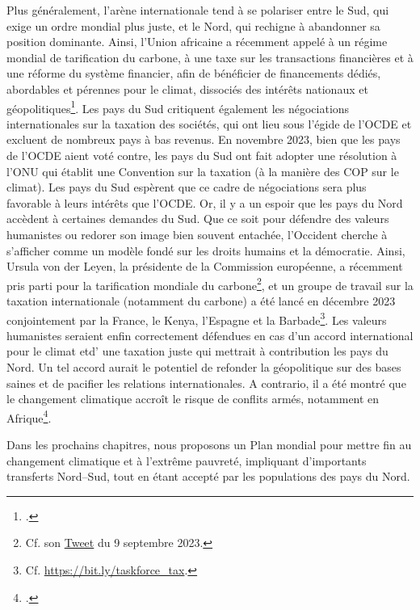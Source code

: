 \documentclass[a5paper,french,openany]{memoir}
\begin{document}
Plus généralement, l'arène internationale tend à se polariser entre le Sud, qui exige un ordre mondial plus juste, et le Nord, qui rechigne à abandonner sa position dominante. Ainsi, l'Union africaine a récemment appelé à un régime mondial de tarification du carbone, à une taxe sur les transactions financières et à une réforme du système financier, afin de bénéficier de financements dédiés, abordables et pérennes pour le climat, dissociés des intérêts nationaux et géopolitiques\footnote{\cite{african_union_african_2023}.}. Les pays du Sud critiquent également les négociations internationales sur la taxation des sociétés, qui ont lieu sous l'égide de l'OCDE et excluent de nombreux pays à bas revenus. En novembre 2023, bien que les pays de l'OCDE aient voté contre, les pays du Sud ont fait adopter une résolution à l'ONU qui établit une Convention sur la taxation (à la manière des COP sur le climat). Les pays du Sud espèrent que ce cadre de négociations sera plus favorable à leurs intérêts que l'OCDE. Or, il y a un espoir que les pays du Nord accèdent à certaines demandes du Sud. 
Que ce soit pour défendre des valeurs humanistes ou redorer son image bien souvent entachée, 
l'Occident cherche à s'afficher comme un modèle fondé sur les droits humains et la démocratie. 
Ainsi, Ursula von der Leyen, la présidente de la Commission européenne, a récemment pris parti pour la tarification mondiale du carbone\footnote{Cf. son \href{https://twitter.com/vonderleyen/status/1700416700238225659}{Tweet} du 9 septembre 2023.}, et un groupe de travail sur la taxation internationale (notamment du carbone) a été lancé en décembre 2023 conjointement par la France, le Kenya, l'Espagne et la Barbade\footnote{Cf. \href{https://www.elysee.fr/admin/upload/default/0001/15/91b013291db03bcc5f2f6b84de39a81ae0c04c7d.pdf}{https://bit.ly/taskforce\_tax}.}. 
Les valeurs humanistes seraient enfin correctement défendues en cas d'un accord international pour le climat etd' une taxation juste qui mettrait à contribution les pays du Nord. Un tel accord aurait le potentiel de refonder la géopolitique sur des bases saines et de pacifier les relations internationales. A contrario, il a été montré que le changement climatique accroît le risque de conflits armés, notamment en Afrique\footnote{\cite{burke_warming_2009,eberle_heat_2020}.}.

Dans les prochains chapitres, nous proposons un Plan mondial pour mettre fin au changement climatique et à l'extrême pauvreté, impliquant d'importants transferts Nord--Sud, tout en étant accepté par %
les populations des pays du Nord.
\end{document}
